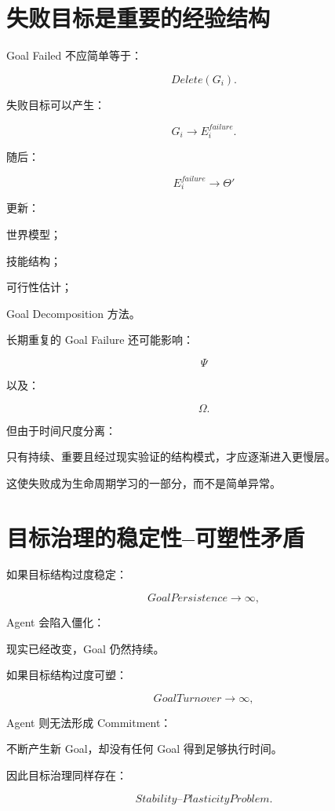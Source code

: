 \section{失败目标是重要的经验结构}

Goal Failed 不应简单等于：

\[
Delete(G_i).
\]

失败目标可以产生：

\[
G_i
\rightarrow
E_i^{failure}.
\]

随后：

\[
E_i^{failure}
\rightarrow
\Theta'
\]

更新：

世界模型；

技能结构；

可行性估计；

Goal Decomposition 方法。

长期重复的 Goal Failure 还可能影响：

\[
\Psi
\]

以及：

\[
\Omega.
\]

但由于时间尺度分离：

\begin{statementbox}
\centering
{}
\end{statementbox}

只有持续、重要且经过现实验证的结构模式，才应逐渐进入更慢层。

这使失败成为生命周期学习的一部分，而不是简单异常。


\section{目标治理的稳定性--可塑性矛盾}

如果目标结构过度稳定：

\[
GoalPersistence\rightarrow\infty,
\]

Agent 会陷入僵化：

现实已经改变，Goal 仍然持续。

如果目标结构过度可塑：

\[
GoalTurnover\rightarrow\infty,
\]

Agent 则无法形成 Commitment：

不断产生新 Goal，却没有任何 Goal 得到足够执行时间。

因此目标治理同样存在：

\[
\boxed{
Stability\text{--}PlasticityProblem.
}
\]

